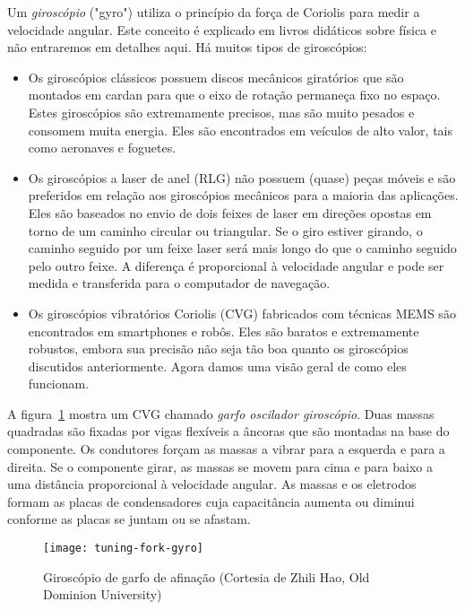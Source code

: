 Um \emph{giroscópio} ("gyro") utiliza o princípio da força de Coriolis para medir a velocidade angular. Este conceito é explicado em livros didáticos sobre física e não entraremos em detalhes aqui. Há muitos tipos de giroscópios:
\begin{itemize}
\item Os giroscópios clássicos possuem discos mecânicos giratórios que são montados em cardan para que o eixo de rotação permaneça fixo no espaço. Estes giroscópios são extremamente precisos, mas são muito pesados e consomem muita energia. Eles são encontrados em veículos de alto valor, tais como aeronaves e foguetes.
\item Os giroscópios a laser de anel (RLG) não possuem (quase) peças móveis e são preferidos em relação aos giroscópios mecânicos para a maioria das aplicações. Eles são baseados no envio de dois feixes de laser em direções opostas em torno de um caminho circular ou triangular. Se o giro estiver girando, o caminho seguido por um feixe laser será mais longo do que o caminho seguido pelo outro feixe. A diferença é proporcional à velocidade angular e pode ser medida e transferida para o computador de navegação.
\item Os giroscópios vibratórios Coriolis (CVG) fabricados com técnicas MEMS são encontrados em smartphones e robôs. Eles são baratos e extremamente robustos, embora sua precisão não seja tão boa quanto os giroscópios discutidos anteriormente. Agora damos uma visão geral de como eles funcionam.
\end{itemize}

A figura~\ref{fig.tuning-gyro-image} mostra um CVG chamado \emph{garfo oscilador giroscópio}. Duas massas quadradas são fixadas por vigas flexíveis a âncoras que são montadas na base do componente. Os condutores forçam as massas a vibrar para a esquerda e para a direita. Se o componente girar, as massas se movem para cima e para baixo a uma distância proporcional à velocidade angular. As massas e os eletrodos formam as placas de condensadores cuja capacitância aumenta ou diminui conforme as placas se juntam ou se afastam.

\begin{figure}
\begin{center}
\texttt{[image: tuning-fork-gyro]}
\end{center}
\caption{Giroscópio de garfo de afinação (Cortesia de Zhili Hao, Old Dominion University)}\label{fig.tuning-gyro-image}
\end{figure}

